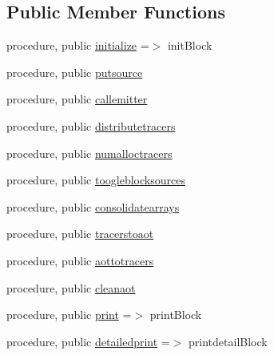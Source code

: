\subsection*{Public Member Functions}
\begin{DoxyCompactItemize}
\item 
procedure, public \mbox{\hyperlink{structblocks__mod_1_1block__class_ad671745ca5dc3227ddb0ed1d9ff45268}{initialize}} =$>$ init\+Block
\item 
procedure, public \mbox{\hyperlink{structblocks__mod_1_1block__class_ac79980e841902691a06212dce50f6331}{putsource}}
\item 
procedure, public \mbox{\hyperlink{structblocks__mod_1_1block__class_ad1d0f1aca1323fad86177deb0b818a51}{callemitter}}
\item 
procedure, public \mbox{\hyperlink{structblocks__mod_1_1block__class_a00f8c114e84499356db3f8b633a6b3a3}{distributetracers}}
\item 
procedure, public \mbox{\hyperlink{structblocks__mod_1_1block__class_a7a3f2eb6823a683a6aaa2159b50ee990}{numalloctracers}}
\item 
procedure, public \mbox{\hyperlink{structblocks__mod_1_1block__class_a73bd9f99f97d7fd882a3ade1103d27ae}{toogleblocksources}}
\item 
procedure, public \mbox{\hyperlink{structblocks__mod_1_1block__class_a68f5bb0cb32b5b51cffd66d472cc45f0}{consolidatearrays}}
\item 
procedure, public \mbox{\hyperlink{structblocks__mod_1_1block__class_ad3521ef8424f47673a2acd15b5bd0545}{tracerstoaot}}
\item 
procedure, public \mbox{\hyperlink{structblocks__mod_1_1block__class_af7ee4536d72f1a114d9289c9e484f703}{aottotracers}}
\item 
procedure, public \mbox{\hyperlink{structblocks__mod_1_1block__class_ab58da434b2813d158b3f688d3c60d02c}{cleanaot}}
\item 
procedure, public \mbox{\hyperlink{structblocks__mod_1_1block__class_a43b4c133934eaadb55d30cf834d1e28c}{print}} =$>$ print\+Block
\item 
procedure, public \mbox{\hyperlink{structblocks__mod_1_1block__class_a937d8dca8393460bc718dafa8a5c03ac}{detailedprint}} =$>$ printdetail\+Block
\end{DoxyCompactItemize}
